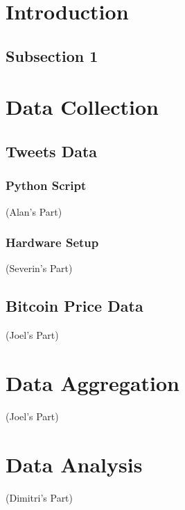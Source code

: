 \documentclass[a4paper,12pt]{article}
\begin{document}
\begin{spacing}{1.2}
\cleardoublepage{}
\section{Introduction}

\subsection{Subsection 1}
\clearpage
\section{Data Collection}
\subsection{Tweets Data}
\subsubsection{Python Script}
(Alan's Part)
\subsubsection{Hardware Setup}
(Severin's Part)
\subsection{Bitcoin Price Data}
(Joel's Part)
\section{Data Aggregation}
(Joel's Part)
\section{Data Analysis}
(Dimitri's Part)


\end{spacing}
\clearpage

\printbibliography
\end{document}
